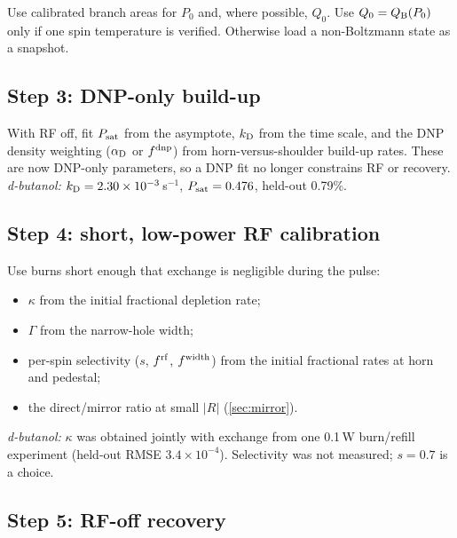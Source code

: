 \documentclass[11pt]{article}
\begin{document}
Use calibrated branch areas for \(P_0\) and, where possible, \(Q_0\). Use \(Q_0=Q_{\rm B}(P_0)\)
only if one spin temperature is verified. Otherwise load a non-Boltzmann state as a snapshot.

\subsection{Step 3: DNP-only build-up}

With RF off, fit \(P_{\rm sat}\) from the asymptote, \(k_{\rm D}\) from the time scale, and the
DNP density weighting (\(\alpha_{\rm D}\) or \(f^{\rm dnp}\)) from horn-versus-shoulder build-up
rates. These are now DNP-only parameters, so a DNP fit no longer constrains RF or recovery.
\emph{d-butanol:} \(k_{\rm D}=2.30\times10^{-3}\)\,s\(^{-1}\), \(P_{\rm sat}=0.476\), held-out
0.79\%.

\subsection{Step 4: short, low-power RF calibration}

Use burns short enough that exchange is negligible during the pulse:
\begin{itemize}
  \item \(\kappa\) from the initial fractional depletion rate;
  \item \(\Gamma\) from the narrow-hole width;
  \item per-spin selectivity (\(s\), \(f^{\rm rf}\), \(f^{\rm width}\)) from the initial
  fractional rates at horn and pedestal;
  \item the direct/mirror ratio at small \(|R|\) (\cref{sec:mirror}).
\end{itemize}
\emph{d-butanol:} \(\kappa\) was obtained jointly with exchange from one 0.1\,W burn/refill
experiment (held-out RMSE \(3.4\times10^{-4}\)). Selectivity was not measured; \(s=0.7\) is a
choice.

\subsection{Step 5: RF-off recovery}
\end{document}
